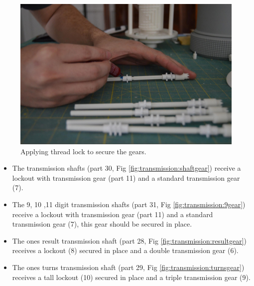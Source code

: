 \documentclass[openany]{book}
\begin{document}
\begin{figure}[!ht]
	\centering
	\includegraphics[width=.75\textwidth]{images/image24.jpg}
	\caption{Applying thread lock to secure the gears.}
	\label{fig:image24}	
\end{figure}



\begin{itemize}
 \item The transmission shafts (part 30, Fig \ref{fig:transmission:shaftgear}) receive a lockout 
with transmission gear (part 11) and a standard transmission gear (7).
 \item The 9, 10 ,11 digit transmission shafts (part 31, Fig \ref{fig:transmission:9gear}) receive a lockout with transmission gear (part 11) and a standard transmission gear (7), this gear should be
secured in place.
 \item The ones result transmission shaft (part 28, Fig \ref{fig:transmission:resultgear}) receives a
lockout (8) secured in place and a double transmission gear (6).
 \item The ones turns transmission shaft (part 29, Fig \ref{fig:transmission:turnsgear}) receives a 
tall lockout (10) secured in place and a triple transmission gear (9).
\end{itemize}
\end{document}
